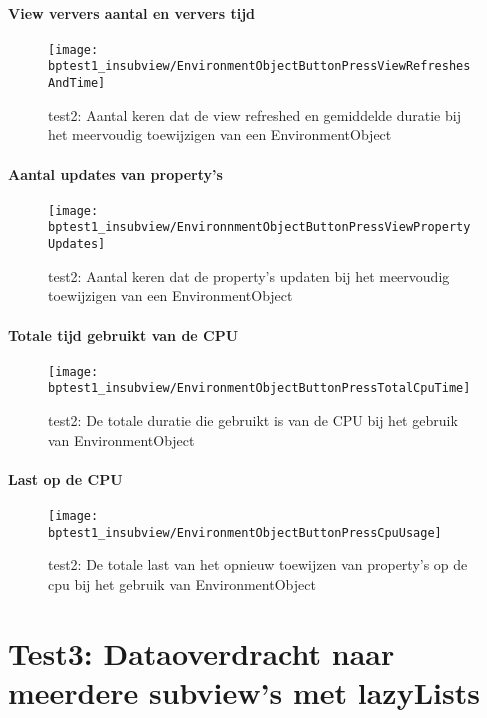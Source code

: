 \paragraph{View ververs aantal en ververs tijd}
\begin{figure}[H]
    \centering
    \texttt{[image: bptest1\_insubview/EnvironmentObjectButtonPressViewRefreshesAndTime]} 
    \caption{test2: Aantal keren dat de view refreshed en gemiddelde duratie bij het meervoudig toewijzigen van een EnvironmentObject}
    \label{fig:viewRefresheEnvironmentObject1}
\end{figure}
\paragraph{Aantal updates van property's}
\begin{figure}[H]
    \centering
    \texttt{[image: bptest1\_insubview/EnvironnmentObjectButtonPressViewPropertyUpdates]} 
    \caption{test2: Aantal keren dat de property's updaten bij het meervoudig toewijzigen van een EnvironmentObject}
    \label{fig:propertyUpdatesEnvironmentObject1}
\end{figure}
\paragraph{Totale tijd gebruikt van de CPU}
\begin{figure}[H]
    \centering
    \texttt{[image: bptest1\_insubview/EnvironmentObjectButtonPressTotalCpuTime]} 
    \caption{test2: De totale duratie die gebruikt is van de CPU bij het gebruik van EnvironmentObject}
    \label{fig:cpuUsageTimeEnvironmentObject1}
\end{figure}
\paragraph{Last op de CPU}
\begin{figure}[H]
    \centering
    \texttt{[image: bptest1\_insubview/EnvironmentObjectButtonPressCpuUsage]} 
    \caption{test2: De totale last van het opnieuw toewijzen van property's op de cpu bij het gebruik van EnvironmentObject}
    \label{fig:cpuWeightEnvironmentObject1}
\end{figure}

\section{Test3: Dataoverdracht naar meerdere subview's met lazyLists}


